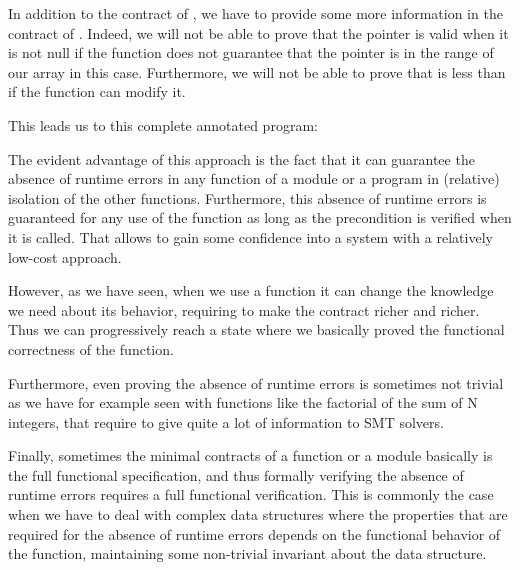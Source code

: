 In addition to the contract of , we have to provide some more
information in the contract of . Indeed, we will not be able
to prove that the pointer is valid when it is not null if the function does not
guarantee that the pointer is in the range of our array in this case.
Furthermore, we will not be able to prove that  is less than
 if the function can modify it.


This leads us to this complete annotated program:






The evident advantage of this approach is the fact that it can guarantee the
absence of runtime errors in any function of a module or a program in (relative)
isolation of the other functions. Furthermore, this absence of runtime errors
is guaranteed for any use of the function as long as the precondition is
verified when it is called. That allows to gain some confidence into a system
with a relatively low-cost approach.



However, as we have seen, when we use a function it can change the knowledge
we need about its behavior, requiring to make the contract richer and richer.
Thus we can progressively reach a state where we basically proved the functional
correctness of the function.



Furthermore, even proving the absence of runtime errors is sometimes not trivial
as we have for example seen with functions like the factorial of the sum of
N integers, that require to give quite a lot of information to SMT solvers.



Finally, sometimes the minimal contracts of a function or a module basically
is the full functional specification, and thus formally verifying the absence
of runtime errors requires a full functional verification. This is commonly the
case when we have to deal with complex data structures where the properties
that are required for the absence of runtime errors depends on the functional
behavior of the function, maintaining some non-trivial invariant about the
data structure.







